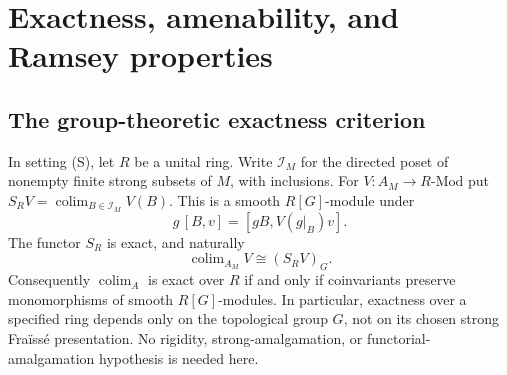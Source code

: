 \section{Exactness, amenability, and Ramsey properties}

\subsection{The group-theoretic exactness criterion}

\begin{theorem}\label{A:coinvariants}
In setting (S), let $R$ be a unital ring. Write $\mathcal I_M$ for
the directed poset of nonempty finite strong subsets of $M$, with
inclusions. For $V:A_M\to R\text{-}\mathrm{Mod}$ put
$S_RV=\operatorname{colim}_{B\in\mathcal I_M}V(B)$. This is a smooth
$R[G]$-module under
\[
 g\,[B,v]=[gB,V(g|_B)v].
\]
The functor $S_R$ is exact, and naturally
\[
 \operatorname{colim}_{A_M}V\cong(S_RV)_G.
\]
Consequently $\operatorname{colim}_{A}$ is exact over $R$ if and only if
coinvariants preserve monomorphisms of smooth $R[G]$-modules. In
particular, exactness over a specified ring depends only on the
topological group $G$, not on its chosen strong Fra\"iss\'e presentation.
No rigidity, strong-amalgamation, or functorial-amalgamation hypothesis
is needed here.
\end{theorem}
